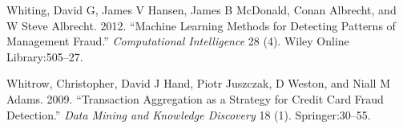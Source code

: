 \documentclass[12pt,]{article}
\begin{document}
\leavevmode\hypertarget{ref-whiting2012machine}{}%
Whiting, David G, James V Hansen, James B McDonald, Conan Albrecht, and
W Steve Albrecht. 2012. ``Machine Learning Methods for Detecting
Patterns of Management Fraud.'' \emph{Computational Intelligence} 28
(4). Wiley Online Library:505--27.

\leavevmode\hypertarget{ref-whitrow2009transaction}{}%
Whitrow, Christopher, David J Hand, Piotr Juszczak, D Weston, and Niall
M Adams. 2009. ``Transaction Aggregation as a Strategy for Credit Card
Fraud Detection.'' \emph{Data Mining and Knowledge Discovery} 18 (1).
Springer:30--55.
\end{document}
